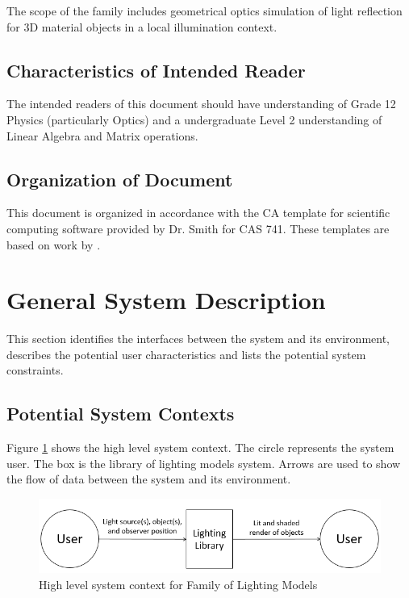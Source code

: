 \documentclass[12pt]{article}
\newcommand{\famname}{Family of Lighting Models} %
\begin{document}
The scope of the family includes geometrical optics simulation of light 
reflection for 3D material objects in a local illumination context.

\subsection{Characteristics of Intended Reader}
The intended readers of this document should have understanding of Grade 12 
Physics (particularly Optics) and a undergraduate Level 2 understanding of 
Linear Algebra and Matrix operations. 

\subsection{Organization of Document}
This document is organized in accordance with the CA template for scientific 
computing software provided by Dr. Smith for CAS 741. These templates are based 
on work by \citet{Smith2006}.

\section{General System Description}
This section identifies the interfaces between the system and its environment,
describes the potential user characteristics and lists the potential system
constraints.

\subsection{Potential System Contexts}
Figure \ref{fig:system-context} shows the high level system context. The circle 
represents the system user. The box is the library of lighting models system. 
Arrows are used to show the flow of data between the system and its environment.

\begin{figure}[h]
	\centering
	\includegraphics[scale=0.8]{./images/system-context}
	\caption{High level system context for \famname}
	\label{fig:system-context}
\end{figure}
\end{document}
